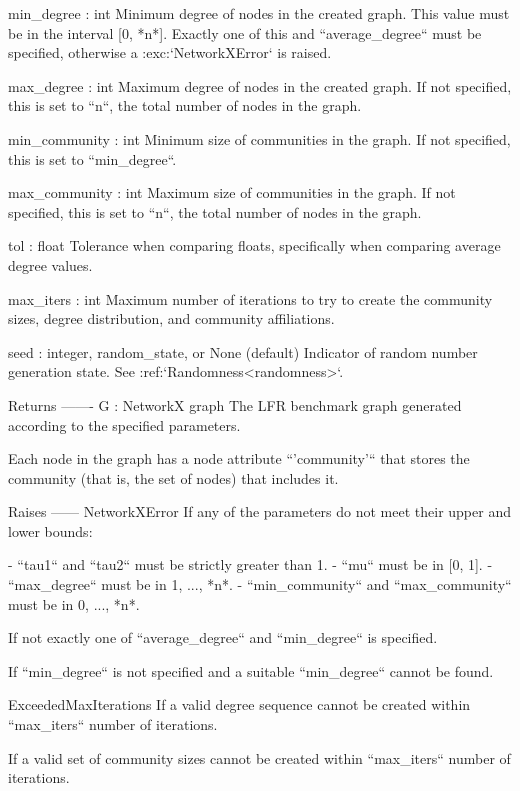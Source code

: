 \begin{DoxyVerb}
min_degree : int
    Minimum degree of nodes in the created graph. This value must be
    in the interval [0, *n*]. Exactly one of this and
    ``average_degree`` must be specified, otherwise a
    :exc:`NetworkXError` is raised.

max_degree : int
    Maximum degree of nodes in the created graph. If not specified,
    this is set to ``n``, the total number of nodes in the graph.

min_community : int
    Minimum size of communities in the graph. If not specified, this
    is set to ``min_degree``.

max_community : int
    Maximum size of communities in the graph. If not specified, this
    is set to ``n``, the total number of nodes in the graph.

tol : float
    Tolerance when comparing floats, specifically when comparing
    average degree values.

max_iters : int
    Maximum number of iterations to try to create the community sizes,
    degree distribution, and community affiliations.

seed : integer, random_state, or None (default)
    Indicator of random number generation state.
    See :ref:`Randomness<randomness>`.

Returns
-------
G : NetworkX graph
    The LFR benchmark graph generated according to the specified
    parameters.

    Each node in the graph has a node attribute ``'community'`` that
    stores the community (that is, the set of nodes) that includes
    it.

Raises
------
NetworkXError
    If any of the parameters do not meet their upper and lower bounds:

    - ``tau1`` and ``tau2`` must be strictly greater than 1.
    - ``mu`` must be in [0, 1].
    - ``max_degree`` must be in {1, ..., *n*}.
    - ``min_community`` and ``max_community`` must be in {0, ...,
      *n*}.

    If not exactly one of ``average_degree`` and ``min_degree`` is
    specified.

    If ``min_degree`` is not specified and a suitable ``min_degree``
    cannot be found.

ExceededMaxIterations
    If a valid degree sequence cannot be created within
    ``max_iters`` number of iterations.

    If a valid set of community sizes cannot be created within
    ``max_iters`` number of iterations.


\end{DoxyVerb}
